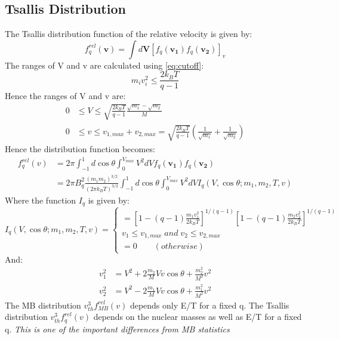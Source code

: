 \documentclass[11pt]{article}
\numberwithin{equation}{section}
\begin{document}
\subsection{Tsallis Distribution}
\label{sec: tsallis dist}
The Tsallis distribution function of the relative velocity is given by:
$$f_{q}^{rel}(\boldsymbol{v})= \int d\boldsymbol{V}\left [ f_{q}(\boldsymbol {v_{1}})f_{q}(\boldsymbol{v_{2}}) \right ]_{v}$$
The ranges of V and v are calculated using \eqref{eq:cutoff}:
\begin{equation}
	m_{i}v_{i}^{2}\leq \frac{2k_{B}T}{q-1}
\end{equation}
Hence the ranges of V and v are:
\begin{align}
	0 &\leq V \leq \sqrt{\frac{2k_{B}T}{q-1}}\frac{\sqrt{m_{1}}-\sqrt{m_{2}}}{M}\\
	0&\leq v \leq v_{1,max} + v_{2,max}=\sqrt{\frac{2k_{B}T}{q-1}}\left( \frac{1}{\sqrt{m_{1}}} + \frac{1}{\sqrt{m_{2}}} \right)
\end{align}
Hence the distribution function becomes:
\begin{align}
	f_{q}^{rel}(v)&=2\pi \int_{-1}^{1} d\cos\theta\int_{0}^{V_{max}}V^{2}dV f_{q}(\boldsymbol{v_{1}})f_{q}(\boldsymbol{v_{2}}) \nonumber\\
	&=2\pi B_{q}^{2}\frac{(m_{1}m_{2})^{3/2}}{(2\pi k_{B}T)^{3/2}}\int_{-1}^{1} d\cos\theta\int_{0}^{V_{max}}V^{2}dV I_{q}(V,\cos\theta;m_{1},m_{2},T,v)
\end{align}
Where the function $I_{q}$ is given by:
\begin{equation}
	I_{q}(V,\cos\theta;m_{1},m_{2},T,v)=\left\{\begin{matrix}
=\left [ 1-(q-1)\frac{m_{1}v_{1}^{2}}{2k_{B}T} \right ]^{1/(q-1)} \left [ 1-(q-1)\frac{m_{2}v_{2}^{2}}{2k_{B}T} \right ]^{1/(q-1)} \\ v_{1}\leq v_{1,max}\; and\; v_{2}\leq v_{2,max} \\
=0 \qquad(otherwise)
\end{matrix}\right.
\end{equation}
And:
\begin{align}
	v_{1}^{2}&=V^{2}+2\frac{m_{2}}{M}Vv\cos\theta+\frac{m_{2}^{2}}{M^{2}}v^{2}\\
	v_{2}^{2}&=V^{2}-2\frac{m_{1}}{M}Vv\cos\theta+\frac{m_{1}^{2}}{M^{2}}v^{2}
\end{align}
The MB distribution $v_{th}^{3}f_{MB}^{rel}(v)$ depends only E/T	for a fixed q. The Tsallis distribution $v_{th}^{3}f_{q}^{rel}(v)$ depends on the nuclear masses as well as E/T for a fixed q. \emph{This is one of the important differences from MB statistics}
\end{document}
